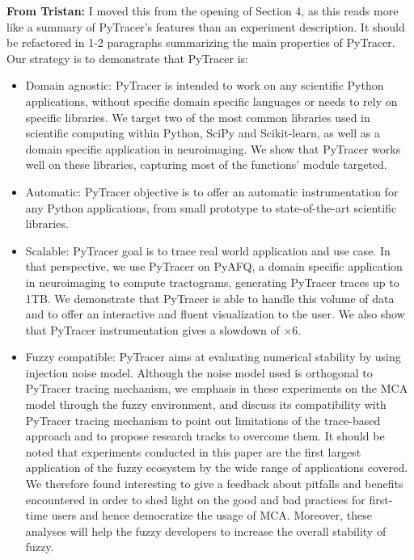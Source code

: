 \documentclass[11pt]{article}
\newcommand{\tristan}[1]{\color{orange}\textbf{From Tristan:} #1\color{black}\xspace}
\newcommand{\pytracer}[0]{PyTracer\xspace}
\begin{document}
\tristan{I moved this from the opening of Section 4, as this reads more like a summary of \pytracer's features than an experiment description. It should be refactored in 1-2 paragraphs summarizing the main properties of \pytracer.}
Our strategy is to demonstrate that \pytracer is:
\begin{itemize}
    \item Domain agnostic: \pytracer is intended to work on any scientific Python applications, 
    without specific domain specific languages or needs to rely on specific libraries.
    We target two of the most common libraries used in scientific computing within Python, SciPy and Scikit-learn, as
    well as a domain specific application in neuroimaging. We show that \pytracer works
    well on these libraries, capturing most of the functions' module targeted.
    \item Automatic: \pytracer objective is to offer an automatic instrumentation for any Python applications,
    from small prototype to state-of-the-art scientific libraries. 
    \item Scalable: \pytracer goal is to trace real world application and use case.
    In that perspective, we use \pytracer on PyAFQ, a domain specific application in neuroimaging to compute 
    tractograms, generating \pytracer traces up to 1TB. We demonstrate that \pytracer is able to 
    handle this volume of data and to offer an interactive and fluent visualization to the user.
    We also show that \pytracer instrumentation gives a slowdown of $\times 6$.
    \item Fuzzy compatible: \pytracer aims at evaluating numerical stability by using injection noise model.
    Although the noise model used is orthogonal to \pytracer tracing mechanism, we emphasis in these experiments 
    on the MCA model through the fuzzy environment, and discuss its compatibility with \pytracer tracing mechanism
    to point out limitations of the trace-based approach and to propose research tracks to overcome them.
    It should be noted that experiments conducted in this paper are the first largest application of the fuzzy ecosystem
    by the wide range of applications covered. We therefore found interesting to give a feedback about pitfalls and benefits encountered
    in order to shed light on the good and bad practices for first-time users and hence democratize the usage of MCA.
    Moreover, these analyses will help the fuzzy developers to increase the overall stability of fuzzy.
\end{itemize}




\appendix
\end{document}
